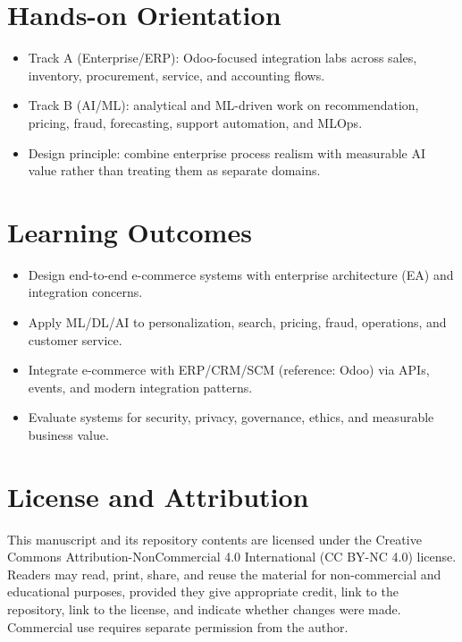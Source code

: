 \documentclass[11pt]{book}
\begin{document}
\section*{Hands-on Orientation}
\begin{itemize}
  \item Track A (Enterprise/ERP): Odoo-focused integration labs across sales, inventory, procurement, service, and accounting flows.
  \item Track B (AI/ML): analytical and ML-driven work on recommendation, pricing, fraud, forecasting, support automation, and MLOps.
  \item Design principle: combine enterprise process realism with measurable AI value rather than treating them as separate domains.
\end{itemize}

\section*{Learning Outcomes}
\begin{itemize}
  \item Design end-to-end e-commerce systems with enterprise architecture (EA) and integration concerns.
  \item Apply ML/DL/AI to personalization, search, pricing, fraud, operations, and customer service.
  \item Integrate e-commerce with ERP/CRM/SCM (reference: Odoo) via APIs, events, and modern integration patterns.
  \item Evaluate systems for security, privacy, governance, ethics, and measurable business value.
\end{itemize}

\section*{License and Attribution}
This manuscript and its repository contents are licensed under the Creative Commons Attribution-NonCommercial 4.0 International (CC BY-NC 4.0) license.
Readers may read, print, share, and reuse the material for non-commercial and educational purposes, provided they give appropriate credit, link to the repository, link to the license, and indicate whether changes were made.
Commercial use requires separate permission from the author.
\end{document}
